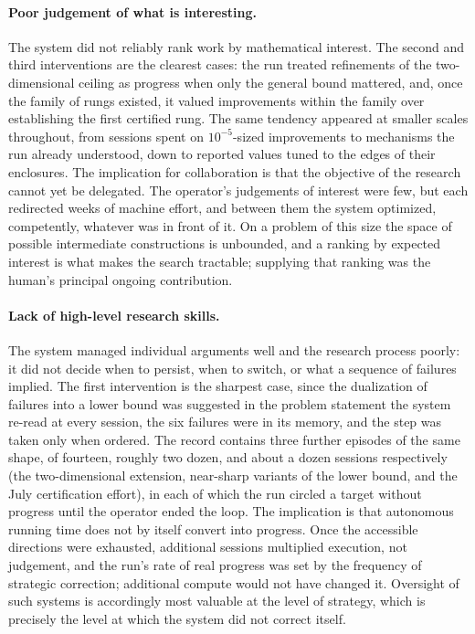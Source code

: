 \paragraph{Poor judgement of what is interesting.}
The system did not reliably rank work by mathematical interest. The second
and third interventions are the clearest cases: the run treated refinements
of the two-dimensional ceiling as progress when only the general bound
mattered, and, once the family of rungs existed, it valued improvements
within the family over establishing the first certified rung. The same
tendency appeared at smaller scales throughout, from sessions spent on
$10^{-5}$-sized improvements to mechanisms the run already understood, down
to reported values tuned to the edges of their enclosures. The implication
for collaboration is that the objective of the research cannot yet be
delegated. The operator's judgements of interest were few, but each
redirected weeks of machine effort, and between them the system optimized,
competently, whatever was in front of it. On a problem of this size the
space of possible intermediate constructions is unbounded, and a ranking by
expected interest is what makes the search tractable; supplying that
ranking was the human's principal ongoing contribution.

\paragraph{Lack of high-level research skills.}
The system managed individual arguments well and the research process
poorly: it did not decide when to persist, when to switch, or what a
sequence of failures implied. The first intervention is the sharpest case,
since the dualization of failures into a lower bound was suggested in the
problem statement the system re-read at every session, the six failures
were in its memory, and the step was taken only when ordered. The record
contains three further episodes of the same shape, of fourteen, roughly two
dozen, and about a dozen sessions respectively (the two-dimensional
extension, near-sharp variants of the lower bound, and the July
certification effort), in each of which the run circled a target without
progress until the operator ended the loop. The implication is that
autonomous running time does not by itself convert into progress. Once the
accessible directions were exhausted, additional sessions multiplied
execution, not judgement, and the run's rate of real progress was set by
the frequency of strategic correction; additional compute would not have
changed it. Oversight of such systems is accordingly most valuable at the
level of strategy, which is precisely the level at which the system did not
correct itself.

